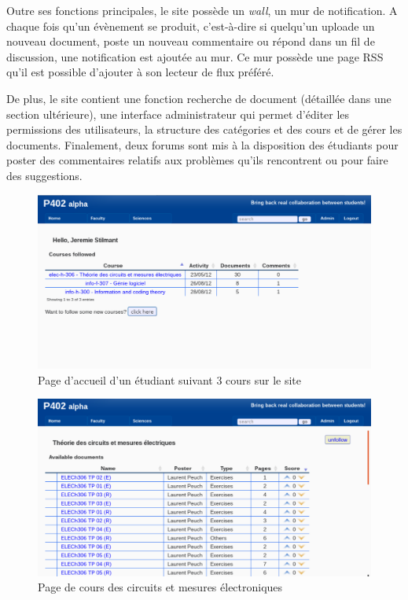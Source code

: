 \documentclass[a4paper,12pt]{article}
\begin{document}
Outre ses fonctions principales, le site possède un \textit{wall}, un mur
de notification. A chaque fois qu'un évènement se produit, c'est-à-dire
si quelqu'un uploade un nouveau document, poste un nouveau commentaire ou répond
dans un fil de discussion, une notification est ajoutée au mur. Ce mur possède
une page RSS qu'il est possible d'ajouter à son lecteur de flux préféré.

De plus, le site contient une fonction recherche de document (détaillée dans une
section ultérieure), une interface administrateur qui permet d'éditer les permissions
des utilisateurs, la structure des catégories et des cours et de gérer les documents.
Finalement, deux forums sont mis à la disposition des étudiants pour poster
des commentaires relatifs aux problèmes qu'ils rencontrent ou pour faire des suggestions.

\begin{figure}
  \centering\includegraphics[scale=0.5]{imgs/home.pdf}
  \caption{Page d'accueil d'un étudiant suivant 3 cours sur le site}
  \label{fig:home}
\end{figure}

\begin{figure}
  \centering\includegraphics[scale=0.5]{imgs/cours.pdf}
  \caption{Page de cours des circuits et mesures électroniques}
  \label{fig:course}
\end{figure}
\end{document}

